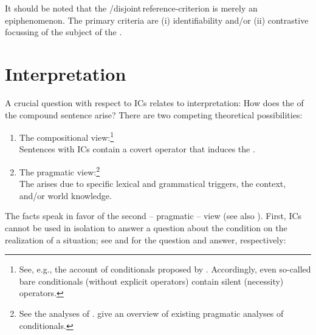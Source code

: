 \documentclass[output=paper,colorlinks,citecolor=brown,newtxmath]{langsci/langscibook}
\begin{document}
\noindent It should be noted that the /disjoint\,reference-criterion is merely an epiphenomenon. The primary criteria are (i) identifiability and/or (ii) contrastive focussing of the subject of the .


\section{Interpretation}\label{sec:interpretation}

A crucial question with respect to ICs relates to interpretation: How does the  of the compound sentence arise? There are two competing theoretical possibilities:

\begin{enumerate}

\item The compositional view:\footnote{See, e.g., the account of conditionals proposed by \citet{Kratzer1979,Kratzer1986,Kratzer1991}. Accordingly, even so-called bare conditionals (without explicit  operators) contain silent  (necessity) operators.}\\ Sentences with ICs contain a covert operator that induces the .

\item The pragmatic view:\footnote{See the analyses of \citet{Stalnaker1975,ByrneJohnsonLaird2010,ElderJaszczolt2016}. \citet[41]{ElderJaszczolt2016} give an overview of existing pragmatic analyses of conditionals.}\\ The  arises due to specific lexical and grammatical triggers, the context, and/or world knowledge.

\end{enumerate}

\noindent The facts speak in favor of the second -- pragmatic -- view (see also \citealt{Milotova2011,Milotova2012}). First, ICs cannot be used in isolation to answer a question about the condition on the realization of a situation; see  and  for the question and answer, respectively:

\ea\label{ex:frage}
\z
\z
\end{document}
